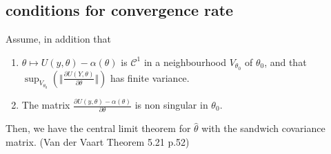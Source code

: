 \documentclass[twoside,11pt]{article}
\begin{document}
 \subsection{conditions for convergence rate}
Assume, in addition that
\begin{enumerate}
    \item $\theta \mapsto U(y, \theta) - \alpha(\theta)$ is $\mathcal{C}^1$ in a neighbourhood $V_{\theta_0}$ of $\theta_0$, and that $\sup_{V_{\theta_0}}(\Vert\frac{\partial{U(Y, \theta) }}{\partial{ \theta  }}\Vert)$ has finite variance.
    \item The matrix $\frac{\partial U(y, \theta) - \alpha(\theta)}{\partial \theta}$ is non singular in $\theta_0$.
\end{enumerate}
Then, we have the central limit theorem for $\hat\theta$ with the sandwich covariance matrix. 
(Van der Vaart Theorem 5.21 p.52)
 
\end{document}
